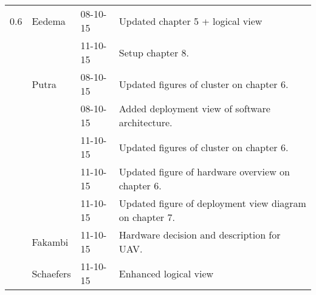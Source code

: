 \begin{longtable}{L{} L{} L{} L{}}
	\midrule
	0.6              & Eedema                & 08-10-15      & Updated chapter 5 + logical view                                                                                                                                                                                           \\
					 & 		                 & 11-10-15      & Setup chapter 8.                                                                                                                                                                                                           \\
					 & Putra                 & 08-10-15      & Updated figures of cluster on chapter 6.                                                                                                                                                                                   \\
	                 &                       & 08-10-15      & Added deployment view of software architecture.                                                                                                                                                                            \\
	                 & 		                 & 11-10-15      & Updated figures of cluster on chapter 6.                                                                                                                                                                                   \\
	                 &                       & 11-10-15      & Updated figure of hardware overview on chapter 6.                                                                                                                                                                          \\
	                 &                       & 11-10-15      & Updated figure of deployment view diagram on chapter 7.                                                                                                                                                                    \\
	                 & Fakambi               & 11-10-15      & Hardware decision and description for UAV.                                                                                                                                                                                 \\
	                 & Schaefers             & 11-10-15      & Enhanced logical view                                                                                                                                                                                                      \\

\end{longtable}
